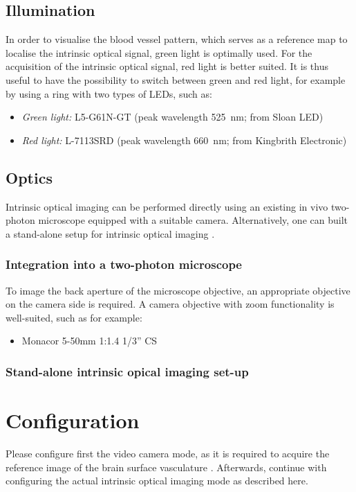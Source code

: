 \subsection{Illumination}
In order to visualise the blood vessel pattern, which serves as a reference map to localise the intrinsic optical signal, green light is optimally used. For the acquisition of the intrinsic optical signal, red light is better suited. It is thus useful to have the possibility to switch between green and red light, for example by using a ring with two types of LEDs, such as:
\begin{itemize}[noitemsep]
	\item \textit{Green light:} L5-G61N-GT (peak wavelength \SI{525}{\nm}; from Sloan LED)
    	\item \textit{Red light:} L-7113SRD (peak wavelength \SI{660}{\nm}; from Kingbrith Electronic)
\end{itemize}

\subsection{Optics}
Intrinsic optical imaging can be performed directly using an existing in vivo two-photon microscope equipped with a suitable camera. Alternatively, one can built a stand-alone setup for intrinsic optical imaging \cite{Langer2011}.

\subsubsection{Integration into a two-photon microscope}
To image the back aperture of the microscope objective, an appropriate objective on the camera side is required. A camera objective with zoom functionality is well-suited, such as for example:
\begin{itemize}
	\item Monacor 5-50mm 1:1.4 1/3'' CS 
\end{itemize}

\subsubsection{Stand-alone intrinsic opical imaging set-up}

\section{Configuration}\label{sec:intrinsic_configuration}
Please configure first the video camera mode, as it is required to acquire the reference image of the brain surface vasculature . Afterwards, continue with configuring the actual intrinsic optical imaging mode as described here.


